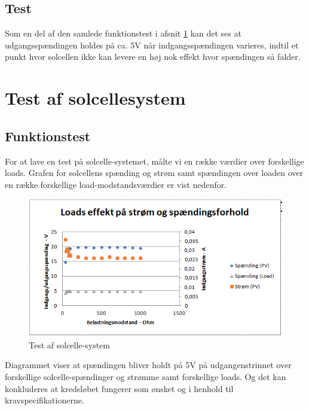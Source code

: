 \documentclass[../main.tex]{subfiles}
\begin{document}
    
    \subsection{Test}
        Som en del af den samlede funktionstest i afsnit \ref{afsnit: testafsnit} kan det ses at udgangsspændingen holdes på ca. 5V når indgangsspændingen varieres, indtil et punkt hvor solcellen ikke kan levere en høj nok effekt hvor spændingen så falder.
        

\section{Test af solcellesystem} \label{afsnit: testafsnit}

\subsection{Funktionstest}
For at lave en test på solcelle-systemet, målte vi en række værdier over forskellige loads. Grafen for solcellens spænding og strøm samt spændingen over loaden over en række forskellige load-modstandsværdier er vist nedenfor.

    \begin{figure}[H]
        \includegraphics[width=\textwidth]{Dokumentation/Figures/PV_FuldTest.png}
        \caption{Test af solcelle-system}
        \label{fig: Test af solcelle-system}
        \end{figure}

        Diagrammet viser at spændingen bliver holdt på 5V på udgangenstrinnet over forskellige solcelle-spændinger og strømme samt forskellige loads. Og det kan konkluderes at kredsløbet fungerer som ønsket og i henhold til kravspecifikationerne.
\end{document}
